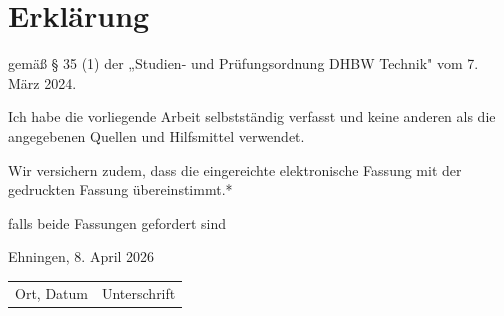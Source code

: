 \section*{Erklärung}
 
gemäß § 35 (1) der „Studien- und Prüfungsordnung DHBW Technik" vom
7. März 2024.
 
\vspace{1em}
 
Ich habe die vorliegende Arbeit selbstständig verfasst und keine anderen als die
angegebenen Quellen und Hilfsmittel verwendet.
 
\vspace{1em}
 
Wir versichern zudem, dass die eingereichte elektronische Fassung mit der gedruckten
Fassung übereinstimmt.*
 
\vspace{0.5em}
 
{\small * falls beide Fassungen gefordert sind}
 
\vspace{3cm}
 
Ehningen, 8. April 2026
 
\vspace{1.5cm}
 
\begin{tabular}{@{}p{5cm}p{7cm}@{}}
    Ort, Datum & Unterschrift \\
\end{tabular}

